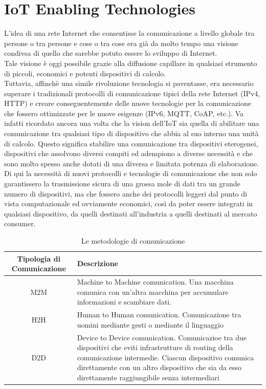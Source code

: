 \section{IoT Enabling Technologies}
\label{sec:iot_enabling_technologies}
L'idea di una rete Internet che consentisse la comunicazione a livello globale tra persone o tra persone e cose o tra cose era già da molto tempo una visione condivsa di quello che sarebbe potuto essere lo sviluppo di Internet. \\
Tale visione è oggi possibile grazie alla diffusione capillare in qualsiasi strumento di piccoli, economici e potenti dispositivi di calcolo. \\
Tuttavia, affinchè una simile rivoluzione tecnologia si paventasse, era necessario superare i tradizionali protocolli di comunicazione tipici della rete Internet (IPv4, HTTP) e creare conseguentemente delle nuove tecnologie per la comunicazione che fossero ottimizzate per le nuove esigenze (IPv6, MQTT, CoAP, etc.).
Va infatti ricordato ancora una volta che la vision dell'IoT sia quella di abilitare una comunicazione tra qualsiasi tipo di dispositivo che abbia al suo interno una unità di calcolo. Questo significa stabilire una comunicazione tra dispositivi eterogenei, dispositivi che assolvono diversi compiti ed adempiono a diverse necessità e che sono molto spesso anche dotati di una diversa e limitata potenza di elaborazione. \\
Di qui la necessità di nuovi protocolli e tecnologie di comunicazione che non solo garantissero la trasmissione sicura di una grossa mole di dati tra un grande numero di dispositivi, ma che fossero anche dei protocolli leggeri dal punto di vista computazionale ed ovviamente economici, così da poter essere integrati in qualsiasi dispositivo, da quelli destinati all'industria a quelli destinati al mercato consumer.\\
\begin{table}
	\begin{center}
		\begin{tabular}{|c|m{8cm}|}
			\hline
			\textbf{Tipologia di Comunicazione} & \textbf{Descrizione} \\
			\hline
			M2M & Machine to Machine comunication. Una macchina comunica con un'altra macchina per accumulare informazioni e scambiare dati.  \\
			\hline
			H2H & Human to Human comunication. Comunicazione tra uomini mediante gesti o mediante il linguaggio \\
			\hline
			D2D & Device to Device comunication. Comunicazioe tra due dispositivi che eviti infrastrutture di routing della comunicazione intermedie. Ciascun dispositivo comunica direttamente con un altro dispositivo che sia da esso direttamente raggiungibile senza intermediari \\
			\hline
		\end{tabular}
		\caption{Le metodologie di comunicazione \cite{famous:paper_communication_metodology}}
		\label{tabel:comunication_metodology}
	\end{center}
\end{table}
